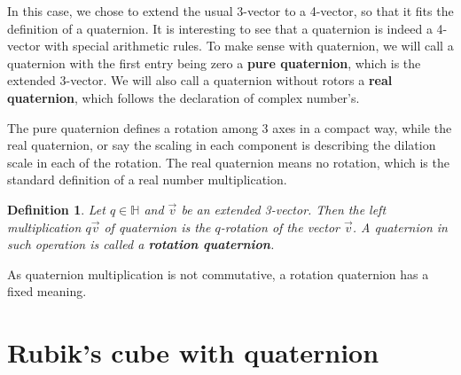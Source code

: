 \documentclass[12pt]{article}
\newtheorem*{definition}{Definition}
\begin{document}
    In this case, we chose to extend the usual 3-vector to a 4-vector, so that it fits the definition of a quaternion. It is interesting to see that a quaternion is indeed a 4-vector with special arithmetic rules. To make sense with quaternion, we will call a quaternion with the first entry being zero a \textbf{pure quaternion}, which is the extended 3-vector. We will also call a quaternion without rotors a \textbf{real quaternion}, which follows the declaration of complex number's.

    The pure quaternion defines a rotation among 3 axes in a compact way, while the real quaternion, or say the scaling in each component is describing the dilation scale in each of the rotation. The real quaternion means no rotation, which is the standard definition of a real number multiplication.

    \begin{definition}
        Let $q\in\mathbb{H}$ and $\vec{v}$ be an extended 3-vector. Then the left multiplication $q\vec{v}$ of quaternion is the $q$-rotation of the vector $\vec{v}$. A quaternion in such operation is called a \textbf{rotation quaternion}.
    \end{definition}

    As quaternion multiplication is not commutative, a rotation quaternion has a fixed meaning.

    \section{Rubik's cube with quaternion}
\end{document}
